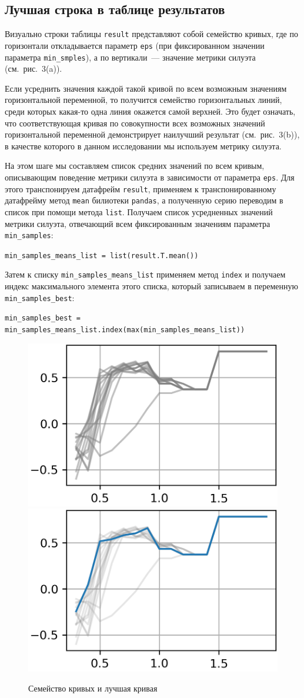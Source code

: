 \documentclass[a4paper,12pt]{article}
\begin{document}
\subsection{Лучшая строка в таблице результатов}


Визуально строки таблицы \texttt{result} представляют собой семейство кривых, где по горизонтали откладывается параметр \texttt{eps} (при фиксированном значении параметра \texttt{min\_smples}), а по вертикали — значение метрики силуэта (см. рис. 3(a)).

Если усреднить значения каждой такой кривой по всем возможным значениям горизонтальной переменной, то получится семейство горизонтальных линий, среди которых какая-то одна линия окажется самой верхней. Это будет означать, что соответствующая кривая по совокупности всех возможных значений горизонтальной переменной демонстрирует наилучший результат (см. рис. 3(b)), в качестве которого в данном исследовании мы используем метрику силуэта.

На этом шаге мы составляем список средних значений по всем кривым, описывающим поведение метрики силуэта в зависимости от параметра \texttt{eps}. Для этого транспонируем датафрейм \texttt{result}, применяем к транспонированному датафрейму метод \texttt{mean} билиотеки \texttt{pandas}, а полученную серию переводим в список при помощи метода \texttt{list}. Получаем список усредненных значений метрики силуэта, отвечающий всем фиксированным значениям параметра \texttt{min\_samples}:

\medskip\noindent
\texttt{min\_samples\_means\_list = list(result.T.mean())}

\medskip\noindent
Затем к списку \texttt{min\_samples\_means\_list} применяем метод \texttt{index} и получаем индекс максимального элемента этого списка, который записываем в переменную \texttt{min\_samples\_best}:

\medskip\noindent
\texttt{min\_samples\_best =\\ min\_samples\_means\_list.index(max(min\_samples\_means\_list))}


\begin{figure}[!h]
	\centering
	\includegraphics[width=0.4\linewidth]{pictures/Пучок кривых}
	\hspace{0.05\linewidth}
	\includegraphics[width=0.4\linewidth]{pictures/Лучшая кривая}\\
	\caption{Семейство кривых и лучшая кривая}
\end{figure}
\end{document}
